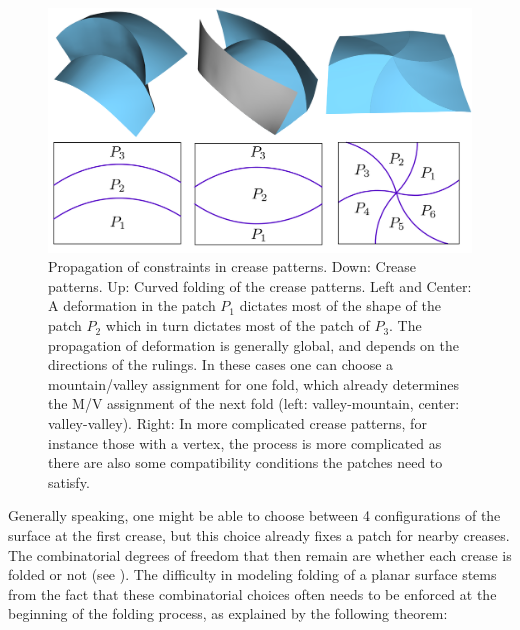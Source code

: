 \begin{figure} [h]
	\centering
	\includegraphics[width=\linewidth]{figures/multiple_crease_patterns}
	\caption{Propagation of constraints in crease patterns. Down: Crease patterns. Up: Curved folding of the crease patterns. Left and Center: A deformation in the patch $P_1$ dictates most of the shape of the patch $P_2$ which in turn dictates most of the patch of $P_3$. The propagation of deformation is generally global, and depends on the directions of the rulings. In these cases one can choose a mountain/valley assignment for one fold, which already determines the M/V assignment of the next fold (left: valley-mountain, center: valley-valley). Right: In more complicated crease patterns, for instance those with a vertex, the process is more complicated as there are also some compatibility conditions the patches need to satisfy. }
	\label{fig:multiple_crease_patterns}
\end{figure}

Generally speaking, one might be able to choose between 4 configurations of the surface at the first crease, but this choice already fixes a patch for nearby creases. The combinatorial degrees of freedom that then remain are whether each crease is folded or not (see  ). The difficulty in modeling folding of a planar surface stems from the fact that these combinatorial choices often needs to be enforced at the beginning of the folding process, as explained by the following theorem:%

